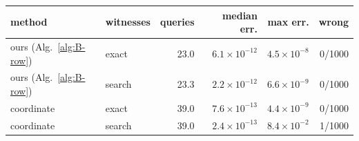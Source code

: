 \begin{tabular}{llrrrr}
\toprule
method & witnesses & queries & median err. & max err. & wrong\\
\midrule
ours (Alg.~\ref{alg:B-row}) & exact & 23.0 & $6.1\times10^{-12}$ & $4.5\times10^{-8}$ & 0/1000\\
ours (Alg.~\ref{alg:B-row}) & search & 23.3 & $2.2\times10^{-12}$ & $6.6\times10^{-9}$ & 0/1000\\
coordinate~\cite[\S5.2]{DBLP:conf/crypto/CarliniJM20} & exact & 39.0 & $7.6\times10^{-13}$ & $4.4\times10^{-9}$ & 0/1000\\
coordinate~\cite[\S5.2]{DBLP:conf/crypto/CarliniJM20} & search & 39.0 & $2.4\times10^{-13}$ & $8.4\times10^{-2}$ & 1/1000\\
\bottomrule
\end{tabular}
